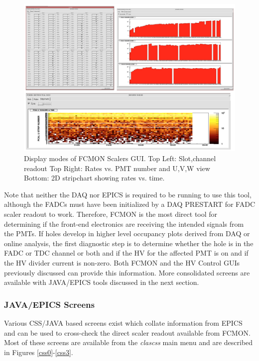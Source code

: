 \documentclass[letterpaper,10pt]{article}
\begin{document}
\begin{figure}[htbp]
  \centering
  \includegraphics[width= 7in, keepaspectratio = true]{fcmon-screens}
  \vspace{2mm}
  \caption{Display modes of FCMON Scalers GUI. Top Left: Slot,channel readout Top Right: Rates vs. PMT
    number and U,V,W view Bottom: 2D stripchart showing rates vs. time.}
\label{fcmon2}
\end{figure}
Note that neither the DAQ nor EPICS is required to be running to use this tool, although the FADCs must have been initialized by a DAQ PRESTART for FADC scaler readout to work. Therefore, FCMON is the most direct tool for determining if the front-end
electronics are receiving the intended signals from the PMTs. If holes develop in higher level occupancy plots derived from DAQ or online analysis, the first diagnostic step is to determine whether the hole is in the FADC or TDC channel or both and if the HV for the affected PMT is on and if the HV divider current is non-zero.  Both FCMON and the
HV Control GUIs previously discussed can provide this information.  More consolidated screens are available with JAVA/EPICS tools discussed in the next section.

\subsubsection{JAVA/EPICS Screens}

Various CSS/JAVA based screens exist which collate information from EPICS and can be used to cross-check the direct scaler readout available from FCMON. Most of these screens are available from the {\it clascss} main menu and are described in Figures \ref{css0}-\ref{css3}.
 
\end{document}
